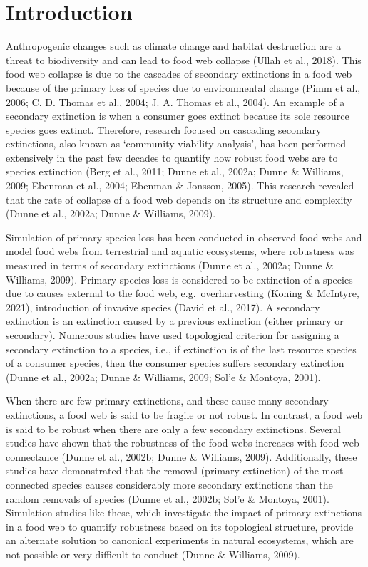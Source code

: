 \documentclass{article}
\begin{document}

\hypertarget{introduction}{%
\section{Introduction}\label{introduction}}

Anthropogenic changes such as climate change and habitat destruction are
a threat to biodiversity and can lead to food web collapse (Ullah et
al., 2018). This food web collapse is due to the cascades of secondary
extinctions in a food web because of the primary loss of species due to
environmental change (Pimm et al., 2006; C. D. Thomas et al., 2004; J.
A. Thomas et al., 2004). An example of a secondary extinction is when a
consumer goes extinct because its sole resource species goes extinct.
Therefore, research focused on cascading secondary extinctions, also
known as `community viability analysis', has been performed extensively
in the past few decades to quantify how robust food webs are to species
extinction (Berg et al., 2011; Dunne et al., 2002a; Dunne \& Williams,
2009; Ebenman et al., 2004; Ebenman \& Jonsson, 2005). This research
revealed that the rate of collapse of a food web depends on its
structure and complexity (Dunne et al., 2002a; Dunne \& Williams, 2009).

Simulation of primary species loss has been conducted in observed food
webs and model food webs from terrestrial and aquatic ecosystems, where
robustness was measured in terms of secondary extinctions (Dunne et al.,
2002a; Dunne \& Williams, 2009). Primary species loss is considered to
be extinction of a species due to causes external to the food web,
e.g.~overharvesting (Koning \& McIntyre, 2021), introduction of invasive
species (David et al., 2017). A secondary extinction is an extinction
caused by a previous extinction (either primary or secondary). Numerous
studies have used topological criterion for assigning a secondary
extinction to a species, i.e., if extinction is of the last resource
species of a consumer species, then the consumer species suffers
secondary extinction (Dunne et al., 2002a; Dunne \& Williams, 2009;
Sol'e \& Montoya, 2001).

When there are few primary extinctions, and these cause many secondary
extinctions, a food web is said to be fragile or not robust. In
contrast, a food web is said to be robust when there are only a few
secondary extinctions. Several studies have shown that the robustness of
the food webs increases with food web connectance (Dunne et al., 2002b;
Dunne \& Williams, 2009). Additionally, these studies have demonstrated
that the removal (primary extinction) of the most connected species
causes considerably more secondary extinctions than the random removals
of species (Dunne et al., 2002b; Sol'e \& Montoya, 2001). Simulation
studies like these, which investigate the impact of primary extinctions
in a food web to quantify robustness based on its topological structure,
provide an alternate solution to canonical experiments in natural
ecosystems, which are not possible or very difficult to conduct (Dunne
\& Williams, 2009).
\end{document}
